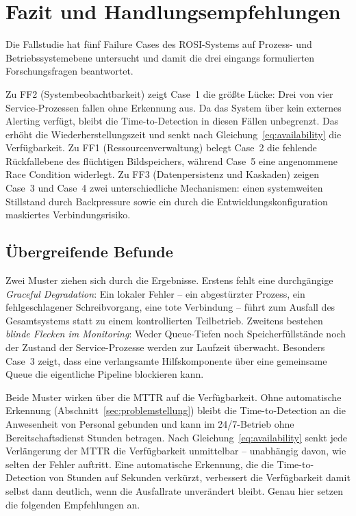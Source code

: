 
\section{Fazit und Handlungsempfehlungen}
\label{sec:fazit}

Die Fallstudie hat fünf Failure Cases des ROSI-Systems auf Prozess- und
Betriebssystemebene untersucht und damit die drei eingangs formulierten
Forschungsfragen beantwortet.

Zu FF2 (Systembeobachtbarkeit) zeigt Case~1 die größte Lücke: Drei von vier
Service-Prozessen fallen ohne Erkennung aus. Da das System über kein externes Alerting
verfügt, bleibt die Time-to-Detection in diesen Fällen unbegrenzt. Das erhöht die
Wiederherstellungszeit und senkt nach Gleichung~\ref{eq:availability} die Verfügbarkeit.
Zu FF1 (Ressourcenverwaltung) belegt Case~2 die fehlende Rückfallebene des flüchtigen
Bildspeichers, während Case~5 eine angenommene Race Condition widerlegt. Zu FF3
(Datenpersistenz und Kaskaden) zeigen Case~3 und Case~4 zwei unterschiedliche Mechanismen:
einen systemweiten Stillstand durch Backpressure sowie ein durch die
Entwicklungskonfiguration maskiertes Verbindungsrisiko.

\subsection{Übergreifende Befunde}
\label{sec:fazit-uebergreifend}

Zwei Muster ziehen sich durch die Ergebnisse. Erstens fehlt eine durchgängige
\textit{Graceful Degradation}: Ein lokaler Fehler -- ein abgestürzter Prozess, ein
fehlgeschlagener Schreibvorgang, eine tote Verbindung -- führt zum Ausfall des
Gesamtsystems statt zu einem kontrollierten Teilbetrieb. Zweitens bestehen
\textit{blinde Flecken im Monitoring}: Weder Queue-Tiefen noch Speicherfüllstände noch der
Zustand der Service-Prozesse werden zur Laufzeit überwacht. Besonders Case~3 zeigt, dass
eine verlangsamte Hilfskomponente über eine gemeinsame Queue die eigentliche Pipeline
blockieren kann.

Beide Muster wirken über die MTTR auf die Verfügbarkeit. Ohne automatische Erkennung
(Abschnitt~\ref{sec:problemstellung}) bleibt die Time-to-Detection an die Anwesenheit von
Personal gebunden und kann im 24/7-Betrieb ohne Bereitschaftsdienst Stunden betragen.
Nach Gleichung~\ref{eq:availability} senkt jede Verlängerung der MTTR die Verfügbarkeit
unmittelbar -- unabhängig davon, wie selten der Fehler auftritt. Eine automatische
Erkennung, die die Time-to-Detection von Stunden auf Sekunden verkürzt, verbessert die
Verfügbarkeit damit selbst dann deutlich, wenn die Ausfallrate unverändert bleibt. Genau
hier setzen die folgenden Empfehlungen an.

